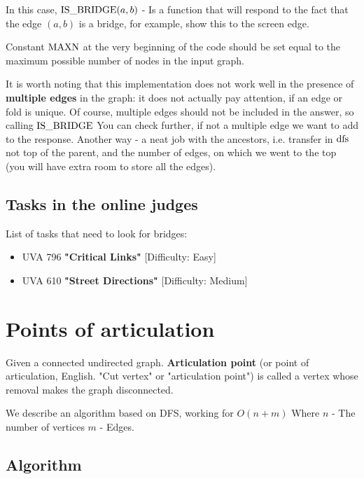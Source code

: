 In this case, ${\rm IS \_BRIDGE} (a, b)$ - Is a function that will respond to the fact that the edge $(a, b)$ is a bridge, for example, show this to the screen edge.

Constant ${\rm MAXN}$ at the very beginning of the code should be set equal to the maximum possible number of nodes in the input graph.

It is worth noting that this implementation does not work well in the presence of \textbf{multiple edges} in the graph: it does not actually pay attention, if an edge or fold is unique. Of course, multiple edges should not be included in the answer, so calling $\rm IS \_BRIDGE$ You can check further, if not a multiple edge we want to add to the response. Another way - a neat job with the ancestors, i.e. transfer in $\rm dfs$ not top of the parent, and the number of edges, on which we went to the top (you will have extra room to store all the edges).

\subsection{ Tasks in the online judges }

List of tasks that need to look for bridges:

\begin{itemize}

\item UVA 796 \textbf{"Critical Links"} [Difficulty: Easy]

\item UVA 610 \textbf{"Street Directions"} [Difficulty: Medium]

\end{itemize}

\section{ Points of articulation }
Given a connected undirected graph. \textbf{Articulation point} (or point of articulation, English. "Cut vertex" or "articulation point") is called a vertex whose removal makes the graph disconnected.

We describe an algorithm based on DFS, working for $O (n + m)$ Where $n$ - The number of vertices $m$ - Edges.

\subsection{ Algorithm }

